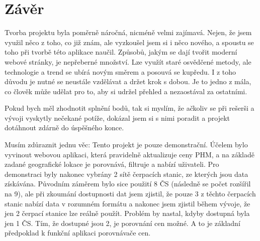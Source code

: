 \chapter{Závěr}
\label{sec:conclusion}

Tvorba projektu byla poměrně náročná, nicméně velmi zajímavá.
Nejen, že jsem využil něco z toho, co již znám, ale vyzkoušel jsem si
i něco nového, a spoustu se toho při tvorbě této aplikace naučil.
Způsobů, jakým se dají tvořit moderní webové stránky, je nepřeberné
množství. Lze využít staré osvědčené metody, ale technologie a trend
se ubírá novým směrem a posouvá se kupředu. I z toho důvodu je nutné
se neustále vzdělávat a držet krok s dobou. Je to jedno z mála, co člověk
může udělat pro to, aby si udržel přehled a nezaostával za ostatními.

Pokud bych měl zhodnotit splnění bodů, tak si myslím, že ačkoliv
se při rešerši a vývoji vyskytly nečekané potíže, dokázal jsem si s nimi
poradit a projekt dotáhnout zdárně do úspěšného konce.

Musím zdůraznit jednu věc: Tento projekt je pouze demonstrační.
Účelem bylo vyvinout webovou aplikaci, která pravidelně aktualizuje
ceny PHM, a na základě zadané geografické lokace je porovnává, filtruje
a nabízí uživateli. Pro demonstraci byly nakonec vybrány 2 sítě čerpacích
stanic, ze kterých jsou data získávána. Původním záměrem bylo sice použití
8 ČS (následně se počet rozšířil na 9), ale při zkoumání dostupnosti dat
jsem zjistil, že pouze 3 z těchto čerpacích stanic nabízí data v rozumném
formátu a nakonec jsem zjistil během vývoje, že jen 2 čerpací stanice
lze reálně použít. Problém by nastal, kdyby dostupná byla jen 1 ČS.
Tím, že dostupné jsou 2, je porovnání cen možné. A to je základní předpoklad
k funkční aplikaci porovnávače cen.

